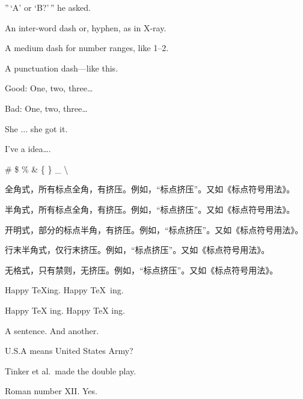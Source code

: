 \documentclass[UTF8]{ctexart}
\begin{document}
	''\,‘A’ or ‘B?’\,'' he asked.
	
	An inter-word dash or, hyphen, as in X-ray.
	
	A medium dash for number ranges, like 1--2.
	
	A punctuation dash---like this.
	
	Good: One, two, three\dots
	
	Bad: One, two, three\ldots
	
	She $\ldots$ she got it.
	
	I've a idea\ldots.
	
	\# \quad \$ \quad \% \quad \& \quad
	\{ \quad \} \quad \_ \quad \textbackslash
	
	全角式，所有标点全角，有挤压。例如，“标点挤压”。又如《标点符号用法》。
	
	半角式，所有标点全角，有挤压。例如，“标点挤压”。又如《标点符号用法》。
	
	开明式，部分的标点半角，有挤压。例如，“标点挤压”。又如《标点符号用法》。
	
	行末半角式，仅行末挤压。例如，“标点挤压”。又如《标点符号用法》。
	
	无格式，只有禁则，无挤压。例如，“标点挤压”。又如《标点符号用法》。
	
	Happy \TeX ing. Happy \TeX\ ing.
	
	Happy \TeX{} ing. Happy {\TeX} ing.
	
	
	A sentence. And another.
	
	U.S.A means United States Army?
	
	Tinker et al.\ made the double play.
	
	Roman number XII\@. Yes.
	
	
\end{document}
